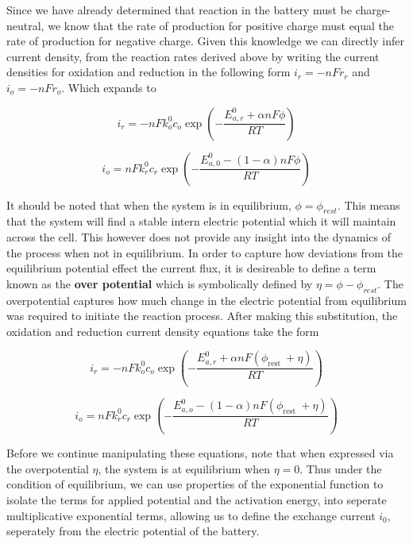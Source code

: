 \documentclass[lettersize,journal]{IEEEtran}
\begin{document}
\noindent Since we have already determined that reaction in the battery must be charge-neutral, we know that the rate of production for positive charge must equal the rate of production for negative charge. Given this knowledge we can directly infer current density, from the reaction rates derived above by writing the current densities for oxidation and reduction in the following form $i_r = -nFr_{r} $ and $i_o = -nFr_{o}$. Which expands to

\begin{equation}
i_{r}=-n F k_{o}^{0} c_{o} \exp \left(-\frac{E_{a, r}^{0}+\alpha n F \phi}{R T}\right)
\end{equation}

\begin{equation}
i_{o}=n F k_{r}^{0} c_{r} \exp \left(-\frac{E_{a, 0}^{0}-(1-\alpha) n F \phi}{R T}\right)
\end{equation}


\noindent It should be noted that when the system is in equilibrium, $\phi = \phi_{rest}$. This means that the system will find a stable intern electric potential which it will maintain across the cell. This however does not provide any insight into the dynamics of the process when not in equilibrium. In order to capture how deviations from the equilibrium potential effect the current flux, it is desireable to define a term known as the \textbf{over potential} which is symbolically defined by $\eta = \phi - \phi_{rest}$. The overpotential captures how much change in the electric potential from equilibrium was required to initiate the reaction process. After making this substitution, the oxidation and reduction current density equations take the form

\begin{equation}
i_{r}=-n F k_{o}^{0} c_{o} \exp \left(-\frac{E_{a, r}^{0}+\alpha n F\left(\phi_{\text {rest }}+\eta\right)}{R T}\right)
\end{equation}

\begin{equation}
i_{o}=n F k_{r}^{0} c_{r} \exp \left(-\frac{E_{a, o}^{0}-(1-\alpha) n F\left(\phi_{\text {rest }}+\eta\right)}{R T}\right)
\end{equation}


\noindent Before we continue manipulating these equations, note that when expressed via the overpotential $\eta$, the system is at equilibrium when $\eta = 0$. Thus under the condition of equilibrium, we can use properties of the exponential function to isolate the terms for applied potential and the activation energy, into seperate multiplicative exponential terms, allowing us to define the exchange current $i_0$, seperately from the electric potential of the battery.
\end{document}

